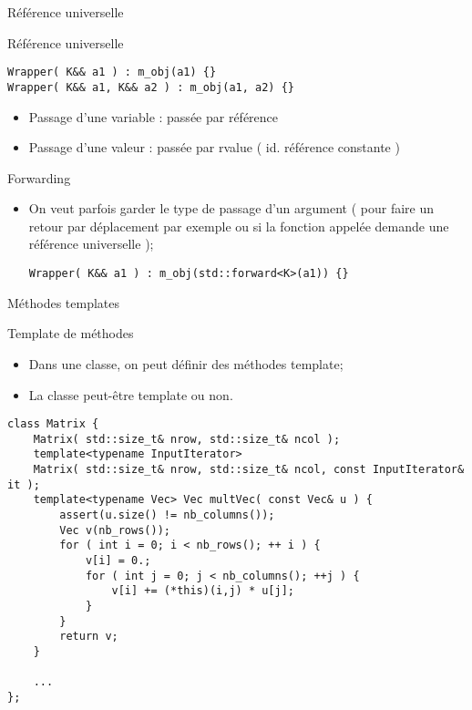 \documentclass[handout,10pt]{beamer}
\begin{document}
\begin{frame}[fragile]{Référence universelle}
\scriptsize
\begin{block}{Référence universelle}
\begin{lstlisting}
Wrapper( K&& a1 ) : m_obj(a1) {}
Wrapper( K&& a1, K&& a2 ) : m_obj(a1, a2) {}
\end{lstlisting}
\begin{itemize}
 \item Passage d'une variable : passée par référence
 \item Passage d'une valeur   : passée par rvalue ( id. référence constante )
\end{itemize}
\end{block}
\begin{block}{Forwarding}
\begin{itemize}
\item On veut parfois garder le type de passage d'un argument ( pour faire un retour par déplacement par exemple ou si la fonction appelée demande une référence universelle );
\begin{lstlisting}
Wrapper( K&& a1 ) : m_obj(std::forward<K>(a1)) {}
\end{lstlisting}
\end{itemize}
\end{block}
\end{frame}

\begin{frame}[fragile]{Méthodes templates}
\scriptsize
\begin{block}{Template de méthodes}
\begin{itemize}
 \item Dans une classe, on peut définir des méthodes template;
 \item La classe peut-être template ou non.
\end{itemize}
\begin{lstlisting}
class Matrix {
    Matrix( std::size_t& nrow, std::size_t& ncol );
    template<typename InputIterator>
    Matrix( std::size_t& nrow, std::size_t& ncol, const InputIterator& it );
    template<typename Vec> Vec multVec( const Vec& u ) {
        assert(u.size() != nb_columns());
        Vec v(nb_rows());
        for ( int i = 0; i < nb_rows(); ++ i ) {
            v[i] = 0.;
            for ( int j = 0; j < nb_columns(); ++j ) {
                v[i] += (*this)(i,j) * u[j];
            }
        }
        return v;
    }
    
    ...
};
\end{lstlisting}
\end{block}

\end{frame}
\end{document}
